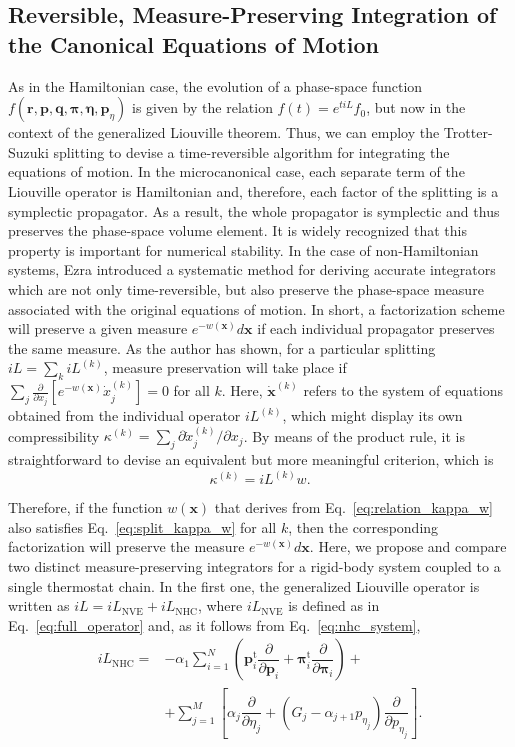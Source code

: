 \documentclass[aip,jcp,reprint,amsmath,amssymb]{revtex4-1}
\newcommand{\vt}[1]{\boldsymbol{\mathbf{#1}}}           %
\newcommand{\tr}[1]{#1^\text{t}}                        %
\newcommand{\diff}[2]{\dfrac{\partial #1}{\partial #2}} %
\begin{document}
\subsection{Reversible, Measure-Preserving Integration of the Canonical Equations of Motion}
\label{sec:numerical_solvers}
As in the Hamiltonian case, the evolution of a phase-space function $f(\vt r, \vt p, \vt q, \vt \pi, \vt \eta,{\vt p}_\eta)$ is given by the relation $f(t) = e^{t i\!L}f_0$, but now in the context of the generalized Liouville theorem.\cite{Tuckerman_1999, Tuckerman2001} Thus, we can employ the Trotter-Suzuki splitting to devise a time-reversible algorithm for integrating the equations of motion. In the microcanonical case, each separate term of the Liouville operator is Hamiltonian and, therefore, each factor of the splitting is a symplectic propagator. As a result, the whole propagator is symplectic and thus preserves the phase-space volume element. It is widely recognized that this property is important for numerical stability.\cite{Skeel1997} In the case of non-Hamiltonian systems, Ezra\cite{Ezra2006} introduced a systematic method for deriving accurate integrators which are not only time-reversible, but also preserve the phase-space measure associated with the original equations of motion. In short, a factorization scheme will preserve a given measure $e^{-w(\vt x)}d\vt x$ if each individual propagator preserves the same measure. As the author has shown,\cite{Ezra2006} for a particular splitting $i\!L = \sum_k i\!L^{(k)}$, measure preservation will take place if $\sum_j \tfrac{\partial}{\partial x_j} [e^{-w(\vt x)}\dot{x}_j^{(k)}] = 0$ for all $k$. Here, $\dot{\vt x}^{(k)}$ refers to the system of equations obtained from the individual operator $i\!L^{(k)}$, which might display its own compressibility $\kappa^{(k)} = \sum_j \partial \dot{x}_j^{(k)}/\partial x_j$. By means of the product rule, it is straightforward to devise an equivalent but more meaningful criterion, which is
\begin{equation}
\label{eq:split_kappa_w}
\kappa^{(k)} = i\!L^{(k)} w.
\end{equation}

Therefore, if the function $w(\vt x)$ that derives from Eq.~\eqref{eq:relation_kappa_w} also satisfies Eq.~\eqref{eq:split_kappa_w} for all $k$, then the corresponding factorization will preserve the measure $e^{-w(\vt x)}d\vt x$. Here, we propose and compare two distinct measure-preserving integrators for a rigid-body system coupled to a single thermostat chain. In the first one, the generalized Liouville operator is written as $i\!L = i\!L_\text{NVE} + i\!L_\text{NHC}$, where $i\!L_\text{NVE}$ is defined as in Eq.~\eqref{eq:full_operator} and, as it follows from Eq.~\eqref{eq:nhc_system},
\begin{equation}
\label{eq:iL_NHC}
\begin{split}
i\!L_\text{NHC} = &-\alpha_1 \sum_{i=1}^N \left( \tr{\vt p}_i \diff{}{\vt p_i} + \tr{\vt \pi}_i \diff{}{\vt \pi_i}\right) + \\
&+ \sum_{j=1}^{M} \left[\alpha_j \diff{}{\eta_j} + (G_j - \alpha_{j+1} p_{\eta_j}) \diff{}{p_{\eta_j}}\right].
\end{split}
\end{equation}
\end{document}
